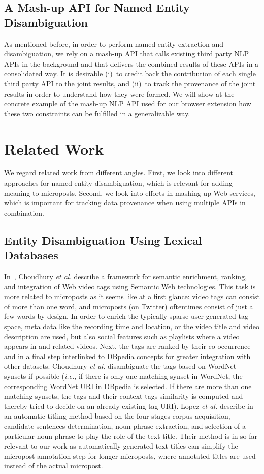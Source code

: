 \subsection{A Mash-up API for Named Entity Disambiguation}
As mentioned before, in order to perform named entity extraction and disambiguation, we rely on a mash-up API that calls existing third party NLP APIs in the background and that delivers the combined results of these APIs in a consolidated way. It is  desirable (i)~to credit back the contribution of each single third party API to the joint results, and (ii)~to track the provenance of the joint results in order to understand how they were formed. We will show at the concrete example of the mash-up NLP API used for our browser extension how these two constraints can be fulfilled in a generalizable way.

\section{Related Work}\label{sec:related}
We regard related work from different angles. First, we look into different approaches for named entity disambiguation, which is relevant for adding meaning to microposts.
Second, we look into efforts in mashing up Web services, which is important for tracking data provenance when using multiple APIs in combination.

\subsection{Entity Disambiguation Using Lexical Databases}
In~\cite{Choudhury:YouTube}, Choudhury \emph{et al.} describe a framework for semantic enrichment, ranking, and integration of
Web video tags using Semantic Web technologies. This task is more related to microposts as it seems like at a first glance: video tags can consist of more than one word, and microposts (on Twitter) oftentimes consist of just a few words by design. In order to enrich the typically sparse user-generated tag space, meta
data like the recording time and location, or the video title and video description are used, but also social features
such as playlists where a video appears in and related videos. Next, the tags are ranked by their co-occurrence and in
a final step interlinked to DBpedia concepts for greater integration with other
datasets. Choudhury \emph{et al.} disambiguate the tags based on WordNet~\cite{Princeton:WordNet} synsets if possible (\emph{i.e.}, if
there is only one matching synset in WordNet, the corresponding WordNet URI in DBpedia is selected. If there are more
than one matching synsets, the tags and their context tags similarity is computed and thereby tried to decide on an
already existing tag URI).
Lopez \emph{et al.} describe in~\cite{Lopez} an automatic titling method based on the four stages corpus 
acquisition, candidate sentences determination, noun 
phrase extraction, and selection of a particular noun phrase to play the role of the text title. Their method is in so far relevant to our work as automatically generated text titles can simplify the micropost annotation step for longer microposts, where annotated titles are used instead of the actual micropost.

